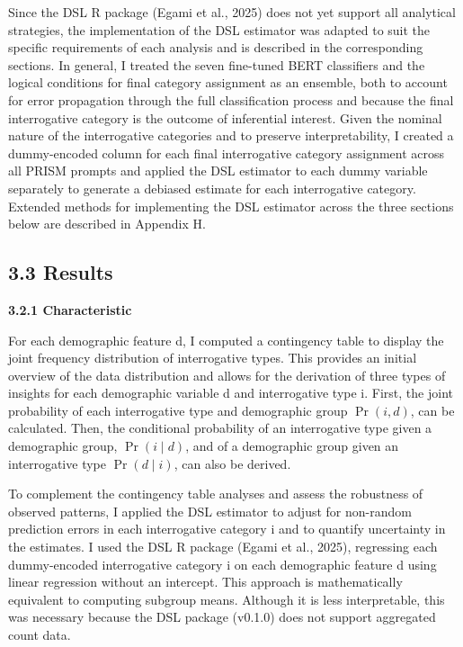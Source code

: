 \documentclass[
  12pt,
]{article}
\begin{document}
Since the DSL R package (Egami et al., 2025) does not yet support all analytical strategies, the implementation of the DSL estimator was adapted to suit the specific requirements of each analysis and is described in the corresponding sections. In general, I treated the seven fine-tuned BERT classifiers and the logical conditions for final category assignment as an ensemble, both to account for error propagation through the full classification process and because the final interrogative category is the outcome of inferential interest. Given the nominal nature of the interrogative categories and to preserve interpretability, I created a dummy-encoded column for each final interrogative category assignment across all PRISM prompts and applied the DSL estimator to each dummy variable separately to generate a debiased estimate for each interrogative category. Extended methods for implementing the DSL estimator across the three sections below are described in Appendix H.

\subsection{3.3 Results}\label{results-1}

\textbf{3.2.1 Characteristic}

For each demographic feature d, I computed a contingency table to display the joint frequency distribution of interrogative types. This provides an initial overview of the data distribution and allows for the derivation of three types of insights for each demographic variable d and interrogative type i. First, the joint probability of each interrogative type and demographic group \(\Pr(i, d)\), can be calculated. Then, the conditional probability of an interrogative type given a demographic group, \(\Pr(i \mid d)\), and of a demographic group given an interrogative type \(\Pr(d \mid i)\), can also be derived.

To complement the contingency table analyses and assess the robustness of observed patterns, I applied the DSL estimator to adjust for non-random prediction errors in each interrogative category i and to quantify uncertainty in the estimates. I used the DSL R package (Egami et al., 2025), regressing each dummy-encoded interrogative category i on each demographic feature d using linear regression without an intercept. This approach is mathematically equivalent to computing subgroup means. Although it is less interpretable, this was necessary because the DSL package (v0.1.0) does not support aggregated count data.
\end{document}
